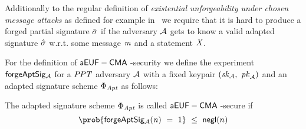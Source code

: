 \begin{definition}[$\cnstaEUFCMA$]\label{def:aeufcma}
Additionally to the regular definition of \textit{existential unforgeability under chosen message attacks} as defined for example in~\cite{vaudenay2006classical} we require that it is hard to produce a forged partial signature $\tilde{\sigma}$ if the
adversary $\mathcal{A}$ gets to know a valid adapted signature $\hat{\sigma}$ w.r.t. some message $\mathit{m}$ and a statement $\mathit{X}$.

For the definition of $\cnstaEUFCMA$-security we define the experiment $\mathsf{forgeAptSig_{\mathcal{A}}}$ for a $\mathit{PPT}$ adversary $\mathcal{A}$ with a fixed keypair $(\mathit{sk}_{\mathcal{A}} ,~ \mathit{pk}_{\mathcal{A}})$ and an adapted signature scheme $\Phi_{\mathit{Apt}}$ as
follows:


\begin{center}
    \fbox{
    \begin{varwidth}{\textwidth}
        \procedure[linenumbering]{$\procExpForg{\varN}$} {
        \varSet \opAssign \cnstEmptySet \\
        \varMsg \opFunResult \cnstAdversary^{\procSignOracle{\cdot}}(\varPubKeyAdv) \\
        (\varWit \opSeperate \varStatement) \opFunResult \procGenR{\varSecParam} \\
        \varSigBob \opFunResult \procSignPtSingle{\varMsg}{\varSecKeyBob} \\
        \varSigAptBob \opFunResult \procAptSig{\varSigBob}{\varWit} \\
        \varSigPt_{\cnstAdversary} \opFunResult \cnstAdversary^{\procSignOracle{\cdot}}(\varSigApt) \\
        \varSigFin \opFunResult \procFinSig{\varSigPt_{\cnstAdversary}}{\varSigBob} \\
        \pcreturn (\varMsg \opNotIn \varSet \opAnd \procVerf{\varMsg}{\varSigFin}{\varPubKeyAdv \opAddPoint \varPubKey})
        }\\[2\baselineskip]
        \procedure[linenumbering]{$\procSignOracle{\varMsg}$} {
        \varSet \opAssign \varSet \opUnion {\varMsg} \\
        (\varWit \opSeperate \varStatement) \opFunResult \procGenR{\varSecParam} \\
        \varSigPt \opFunResult \procSignPtSingle{\varMsg}{\varSecKey} \\
        \varSigApt \opFunResult \procAptSig{\varSigPt}{\varWit} \\
        \pcreturn (\varSigApt \opSeperate \varStatement)
        }\\[2\baselineskip]
    \end{varwidth}
    }
\end{center}
The adapted signature scheme $\Phi_{\mathit{Apt}}$ is called $\cnstaEUFCMA$-secure if
\[ \prob{\procExpForg{\varN} \opEq 1} \opSmEq \funNegl{n} \]
\end{definition}

